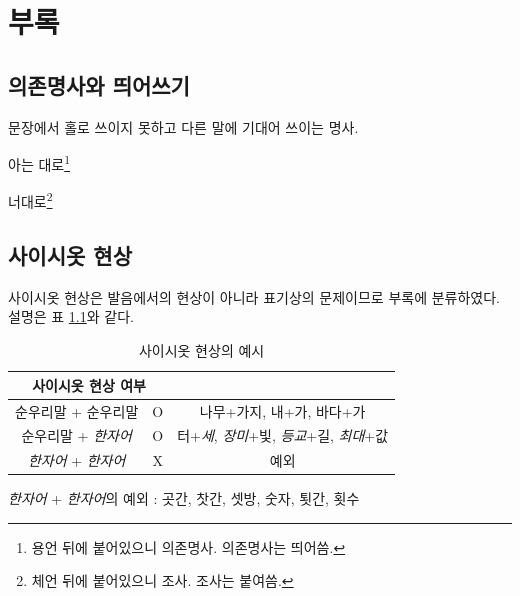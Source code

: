 \documentclass[10pt]{report}
\begin{document}
\chapter{부록}
\section{의존명사와 띄어쓰기}\label{dependent_noun}
문장에서 홀로 쓰이지 못하고 다른 말에 기대어 쓰이는 명사.
\begin{center}
	아는 대로\footnote{용언 뒤에 붙어있으니 의존명사. 의존명사는 띄어씀.}
	
	너대로\footnote{체언 뒤에 붙어있으니 조사. 조사는 붙여씀.}
\end{center}
\section{사이시옷 현상}
사이시옷 현상은 발음에서의 현상이 아니라 표기상의 문제이므로 부록에 분류하였다. 설명은 표 \ref{between}와 같다.
\begin{table}
\begin{center}
	\begin{tabular}{|c|c|c|}
		\hline
		\multicolumn{2}{|c|}{사이시옷 현상 여부} & \\
		\hline
		순우리말 + 순우리말 & O & 나무+가지, 내+가, 바다+가 \\
		\hline
		순우리말 + \textit{한자어} & O & 터+\textit{세}, \textit{장미}+빛, \textit{등교}+길, \textit{최대}+값 \\
		\hline
		\textit{한자어} + \textit{한자어} & X & \small{예외} \\
		\hline
	\end{tabular}
	\caption{사이시옷 현상의 예시}
	\label{between}
\end{center}
\end{table}
\textit{한자어} + \textit{한자어}의 예외 : 곳간, 찻간, 셋방, 숫자, 툇간, 횟수
\end{document}
